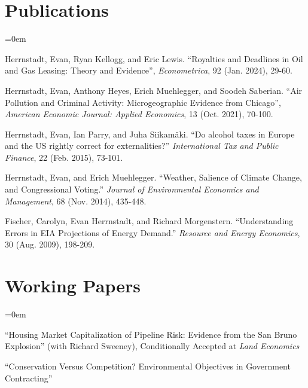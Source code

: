 \documentclass[letterpaper]{article}
\renewenvironment{itemize}{
  \vspace{-0.5em}
  \begin{list}{}{
	\itemsep=0em
    \setlength{\leftmargin}{1.5em}
  }
}{
  \end{list}
}
\begin{document}
\section*{Publications}

\begin{itemize}
\item Herrnstadt, Evan, Ryan Kellogg, and Eric Lewis. “Royalties and Deadlines in Oil and Gas Leasing: Theory and Evidence”, \textit{Econometrica}, 92 (Jan. 2024), 29-60.

\item Herrnstadt, Evan, Anthony Heyes, Erich Muehlegger, and Soodeh Saberian. “Air Pollution and Criminal Activity: Microgeographic Evidence from Chicago”, \textit{American Economic Journal: Applied Economics}, 13 (Oct. 2021), 70-100.

\item Herrnstadt, Evan, Ian Parry, and Juha Siikamäki. “Do alcohol taxes in Europe and the US rightly correct for externalities?” \textit{International Tax and Public Finance}, 22 (Feb. 2015), 73-101.

\item Herrnstadt, Evan, and Erich Muehlegger.  “Weather, Salience of Climate Change, and Congressional Voting.” \textit{Journal of Environmental Economics and Management}, 68 (Nov. 2014), 435-448.

\item Fischer, Carolyn, Evan Herrnstadt, and Richard Morgenstern. “Understanding Errors in EIA Projections of Energy Demand.”  \textit{Resource and Energy Economics}, 30 (Aug. 2009), 198-209.
\end{itemize}

\section*{Working Papers}

\begin{itemize}
\item “Housing Market Capitalization of Pipeline Risk: Evidence from the San Bruno Explosion”
(with Richard Sweeney), Conditionally Accepted at \emph{Land Economics}

\item “Conservation Versus Competition? Environmental Objectives in Government Contracting” 

\end{itemize}
\end{document}
